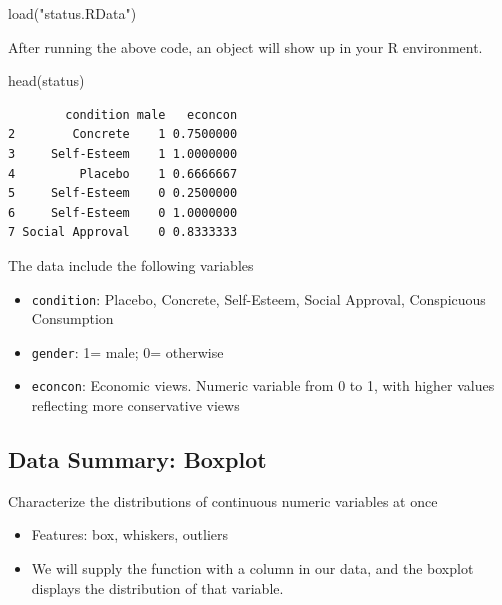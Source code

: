 \documentclass[
  letterpaper,
  DIV=11,
  numbers=noendperiod]{scrreprt}
\newenvironment{Shaded}{\begin{snugshade}}{\end{snugshade}}
\newcommand{\FunctionTok}[1]{\textcolor[rgb]{0.28,0.35,0.67}{#1}}
\newcommand{\NormalTok}[1]{\textcolor[rgb]{0.00,0.23,0.31}{#1}}
\newcommand{\StringTok}[1]{\textcolor[rgb]{0.13,0.47,0.30}{#1}}
\providecommand{\tightlist}{%
  \setlength{\itemsep}{0pt}\setlength{\parskip}{0pt}}\usepackage{longtable,booktabs,array}
\begin{document}
\begin{Shaded}
\begin{Highlighting}[]
\FunctionTok{load}\NormalTok{(}\StringTok{"status.RData"}\NormalTok{)}
\end{Highlighting}
\end{Shaded}

After running the above code, an object will show up in your R
environment.

\begin{Shaded}
\begin{Highlighting}[]
\FunctionTok{head}\NormalTok{(status)}
\end{Highlighting}
\end{Shaded}

\begin{verbatim}
        condition male   econcon
2        Concrete    1 0.7500000
3     Self-Esteem    1 1.0000000
4         Placebo    1 0.6666667
5     Self-Esteem    0 0.2500000
6     Self-Esteem    0 1.0000000
7 Social Approval    0 0.8333333
\end{verbatim}

The data include the following variables

\begin{itemize}
\tightlist
\item
  \texttt{condition}: Placebo, Concrete, Self-Esteem, Social Approval,
  Conspicuous Consumption
\item
  \texttt{gender}: 1= male; 0= otherwise
\item
  \texttt{econcon}: Economic views. Numeric variable from 0 to 1, with
  higher values reflecting more conservative views
\end{itemize}

\hypertarget{data-summary-boxplot}{%
\subsection{Data Summary: Boxplot}\label{data-summary-boxplot}}

Characterize the distributions of continuous numeric variables at once

\begin{itemize}
\tightlist
\item
  Features: box, whiskers, outliers
\item
  We will supply the function with a column in our data, and the boxplot
  displays the distribution of that variable.
\end{itemize}
\end{document}
